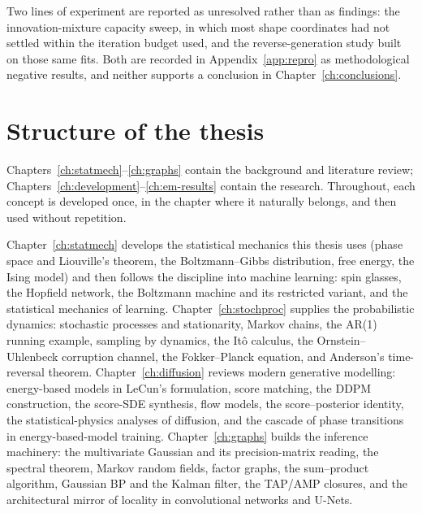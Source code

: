 Two lines of experiment are reported as unresolved rather than as
findings: the innovation-mixture capacity sweep, in which most
shape coordinates had not settled within the iteration budget used, and
the reverse-generation study built on those same fits. Both are recorded
in Appendix~\ref{app:repro} as methodological negative results, and
neither supports a conclusion in Chapter~\ref{ch:conclusions}.

\section{Structure of the thesis}

Chapters~\ref{ch:statmech}--\ref{ch:graphs} contain the background and
literature review; Chapters~\ref{ch:development}--\ref{ch:em-results}
contain the research. Throughout, each concept is developed once, in the
chapter where it naturally belongs, and then used without repetition.

Chapter~\ref{ch:statmech} develops the statistical mechanics this thesis
uses (phase space and Liouville's theorem, the Boltzmann--Gibbs
distribution, free energy, the Ising model) and then follows the
discipline into machine learning: spin glasses, the Hopfield network,
the Boltzmann machine and its restricted variant, and the statistical
mechanics of learning. Chapter~\ref{ch:stochproc} supplies the
probabilistic dynamics: stochastic processes and stationarity, Markov
chains, the AR(1) running example, sampling by dynamics, the It\^o
calculus, the Ornstein--Uhlenbeck corruption channel, the Fokker--Planck
equation, and Anderson's time-reversal theorem.
Chapter~\ref{ch:diffusion} reviews modern generative modelling:
energy-based models in LeCun's formulation, score matching, the DDPM
construction, the score-SDE synthesis, flow models, the score--posterior
identity, the statistical-physics analyses of diffusion, and the cascade
of phase transitions in energy-based-model training.
Chapter~\ref{ch:graphs} builds the inference machinery: the multivariate
Gaussian and its precision-matrix reading, the spectral theorem, Markov
random fields, factor graphs, the sum--product algorithm, Gaussian BP
and the Kalman filter, the TAP/AMP closures, and the architectural
mirror of locality in convolutional networks and U-Nets.

